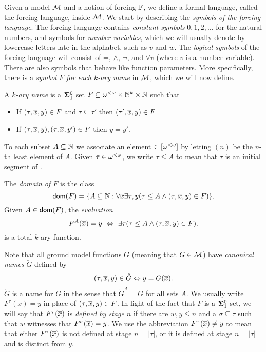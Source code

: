 Given a model $\mathcal{M}$ and a notion of forcing $\mathbb{F}$,
we define a formal language, called the forcing language, inside $\mathcal{M}$.
We start by describing the \textit{symbols of the forcing language}.
The forcing language contains \textit{constant symbols} $0,1,2,\ldots$ for
the natural numbers, and symbols for \textit{number variables},
which we will usually denote by lowercase letters late in the alphabet,
such as $v$ and $w$.
The \textit{logical symbols} of the forcing language will consist of
=, $\land$, $\neg$, and $\forall v$ (where $v$ is a number variable).
There are also symbols that behave like function parameters.
More specifically, there is a
\textit{symbol $F$ for each $k$-ary name} in $\mathcal{M}$, which we will now define.
\begin{definition}\label{D:names}
A \textit{$k$-ary name} is a $\mathbf{\Sigma}^0_1$ set $F\subseteq \omega^{<\omega}\times\mathbb{N}^{k}\times\mathbb{N}$ such that
\begin{itemize}
\item If $(\tau,\overline{x},y)\in F$ and $\tau\subseteq\tau'$ then $(\tau',\overline{x},y)\in F$
\item If $(\tau,\overline{x},y),(\tau,\overline{x},y')\in F$ then $y=y'$.
\end{itemize}
To each subset $A\subseteq\mathbb{N}$ we associate an element \rune$\in[\omega^{<\omega}]$
by letting \rune$(n)$ be the $n$-th least element of $A$.
Given $\tau\in\omega^{<\omega}$, we write $\tau\leq A$ to mean that $\tau$ is an initial segment of \rune.

The \textit{domain of $F$} is the class
$$\mathsf{dom}(F)=\{A\subseteq\mathbb{N}:\forall\overline{x}\exists\tau,y(\tau\leq A\land(\tau,\overline{x},y)\in F)\}.$$
Given $A\in\mathsf{dom}(F)$, the \textit{evaluation}
$$F^A(\tup{x})=y\ \Leftrightarrow \ \exists\tau(\tau\leq A\land(\tau,\tup{x},y)\in F).$$
is a total $k$-ary function.
\end{definition}

Note that all ground model functions $G$ (meaning that $G\in\mathcal{M}$)
have \textit{canonical names} $\check{G}$ defined by
$$(\tau,\overline{x},y)\in\check{G}\Leftrightarrow y=G(\overline{x}).$$
$\check{G}$ is a name for $G$ in the sense that $\check{G}^A=G$ for all sets $A$.
We usually write $F^\tau(x)=y$ in place of $(\tau,\overline{x},y)\in F$.
In light of the fact that $F$ is a $\mathbf{\Sigma}^0_1$ set,
we will say that $F^\tau(\overline{x})$ is \textit{defined by stage $n$}
if there are $w,y\leq n$ and a $\sigma\subseteq\tau$
such that $w$ witnesses that $F^\sigma(\overline{x})=y$.
We use the abbreviation $F^\tau(\overline{x})\neq y$ to mean that
either $F^\tau(\overline{x})$ is not defined at stage $n=|\tau|$,
or it is defined at stage $n=|\tau|$ and is distinct from $y$.

